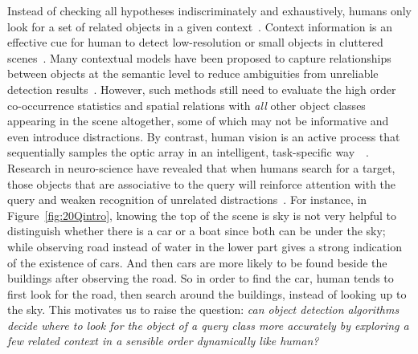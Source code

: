 Instead of checking all hypotheses indiscriminately and exhaustively, humans only look for a set of related objects in a given context~\cite{biederman1982scene, hock1974contextual}. Context information is an effective cue for human to detect low-resolution or small objects in cluttered scenes~\cite{parikh2012exploring}. Many contextual models have been proposed to capture relationships between objects at the semantic level to reduce ambiguities from unreliable detection results~\cite{gould2009decomposing, galleguillos2010context, ladicky2010graph}. %
However, such methods still need to evaluate the high order co-occurrence statistics and spatial relations with \emph{all} other object classes appearing in the scene altogether, some of which may not be informative and even introduce distractions.  By contrast, human vision is an active process that sequentially samples the optic array in an intelligent, task-specific way~\cite{najemnik2005optimal}~. Research in neuro-science have revealed that when humans search for a target, those objects that are associative to the query will reinforce attention with the query and weaken recognition of unrelated distractions~\cite{moores2003associative}. 
For instance, in Figure~\ref{fig:20Qintro}, knowing the top of the scene is sky is not very helpful to distinguish whether there is a car or a boat since both can be under the sky; 
while observing road instead of water in the lower part gives a strong indication of the existence of cars. And then cars are more likely to be found beside the buildings after observing the road. So in order to find the car, human tends to first look for the road, then search around the buildings, instead of looking up to the sky. %
This motivates us to raise the question: \textit{can object detection algorithms decide where to look for the object of a query class more accurately by exploring a few related context in a sensible order dynamically like human?}

